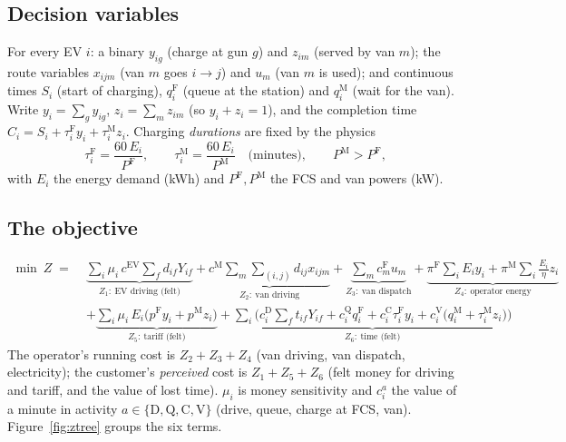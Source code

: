 \subsection{Decision variables}
For every EV $i$: a binary $y_{ig}$ (charge at gun $g$) and $z_{im}$ (served by van $m$); the route variables
$x_{ijm}$ (van $m$ goes $i\!\to\!j$) and $u_m$ (van $m$ is used); and continuous times $S_i$ (start of charging),
$q^{\mathrm F}_i$ (queue at the station) and $q^{\mathrm M}_i$ (wait for the van). Write
$y_i=\sum_g y_{ig}$, $z_i=\sum_m z_{im}$ (so $y_i+z_i=1$), and the completion time
$C_i=S_i+\tau^{\mathrm F}_iy_i+\tau^{\mathrm M}_iz_i$. Charging \emph{durations} are fixed by the physics
\begin{equation}
\tau^{\mathrm F}_i=\frac{60\,E_i}{P^{\mathrm F}},\qquad \tau^{\mathrm M}_i=\frac{60\,E_i}{P^{\mathrm M}}
\quad\text{(minutes)},\qquad P^{\mathrm M}>P^{\mathrm F},
\label{eq:tau}
\end{equation}
with $E_i$ the energy demand (kWh) and $P^{\mathrm F},P^{\mathrm M}$ the FCS and van powers (kW).

\subsection{The objective}
\begin{equation}
\begin{aligned}
\min\ Z \;=\;& \underbrace{\sum_{i}\mu_i\,c^{\mathrm{EV}}\!\sum_{f}d_{if}Y_{if}}_{Z_1:\ \text{EV driving (felt)}}
+\underbrace{c^{\mathrm M}\!\sum_{m}\sum_{(i,j)}d_{ij}x_{ijm}}_{Z_2:\ \text{van driving}}
+\underbrace{\sum_{m}c^{\mathrm F}_mu_m}_{Z_3:\ \text{van dispatch}}
+\underbrace{\pi^{\mathrm F}\!\sum_{i}E_iy_i+\pi^{\mathrm M}\!\sum_{i}\tfrac{E_i}{\eta}z_i}_{Z_4:\ \text{operator energy}}\\[2pt]
&+\underbrace{\sum_{i}\mu_i\,E_i\big(p^{\mathrm F}y_i+p^{\mathrm M}z_i\big)}_{Z_5:\ \text{tariff (felt)}}
+\underbrace{\sum_{i}\Big(c^{\mathrm D}_i\!\sum_{f}t_{if}Y_{if}+c^{\mathrm Q}_i q^{\mathrm F}_i+c^{\mathrm C}_i\tau^{\mathrm F}_iy_i+c^{\mathrm V}_i\big(q^{\mathrm M}_i+\tau^{\mathrm M}_iz_i\big)\Big)}_{Z_6:\ \text{time (felt)}}
\end{aligned}
\label{eq:obj}
\end{equation}
The operator's running cost is $Z_2+Z_3+Z_4$ (van driving, van dispatch, electricity); the customer's
\emph{perceived} cost is $Z_1+Z_5+Z_6$ (felt money for driving and tariff, and the value of lost time).
$\mu_i$ is money sensitivity and $c^{a}_i$ the value of a minute in activity $a\in\{\mathrm D,\mathrm Q,\mathrm C,\mathrm V\}$
(drive, queue, charge at FCS, van). Figure~\ref{fig:ztree} groups the six terms.

